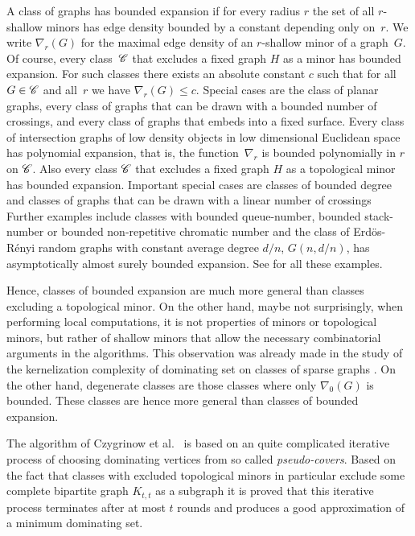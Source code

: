 A class of graphs has
bounded expansion if for every radius $r$ the set of all \mbox{$r$-shallow}
minors has edge density bounded by a constant depending only on~$r$.
We write $\nabla_r(G)$ for the maximal edge density of an
$r$-shallow minor of a graph~$G$.
Of course, every class~$\mathscr{C}$ that excludes a fixed graph $H$ as
a minor has bounded expansion. For such classes there exists an
absolute constant
$c$ such that for all $G\in\mathscr{C}$ and all~$r$
we have $\nabla_r(G)\leq c$.
Special cases are the class of
planar graphs, every class of graphs that can be drawn
with a bounded number of crossings, and every class of graphs
that embeds into a fixed surface.
Every class of intersection graphs of low density objects in low
dimensional Euclidean space has polynomial expansion, that is, the function~$\nabla_r$ is bounded polynomially in $r$ on $\mathscr{C}$. Also
every class $\mathscr{C}$ that excludes a fixed graph $H$ as
a topological minor has bounded expansion.
Important special cases are classes of
bounded degree and classes of graphs that can be drawn
with a linear number of crossings
Further examples include
classes with bounded queue-number, bounded stack-number or bounded
non-repetitive chromatic number
and the class of Erd\"os-R\'enyi random graphs with
constant average degree $d/n$, $G(n,d/n)$, has
asymptotically almost surely bounded expansion. See \cite{har2017approximation,nevsetvril2012characterisations} for all
these examples.

Hence, classes of bounded expansion are much more general than
classes excluding a topological minor. On the other hand, maybe
not surprisingly, when performing local
computations, it is not properties of minors or topological minors, but
rather of shallow minors that allow the necessary combinatorial arguments
in the algorithms. This observation was already made in the study of the kernelization complexity of dominating set on classes of sparse graphs \cite{DrangeDFKLPPRVS16,eiben2019lossy,EickmeyerGKKPRS17,FabianskiPST19,kreutzer2018polynomial}.
On the other hand, degenerate classes
are those classes where only $\nabla_0(G)$ is bounded.
These classes are hence more general than classes of bounded
expansion.

The algorithm of Czygrinow et al.~\cite{czygrinow2018distributed} is
based on an quite complicated iterative process of choosing dominating
vertices from so called
\emph{pseudo-covers}. Based on the fact that classes with excluded topological minors in particular exclude some complete bipartite graph
$K_{t,t}$ as a subgraph it is proved that this iterative process terminates
after at most $t$ rounds and
produces a good approximation of a minimum dominating set.

